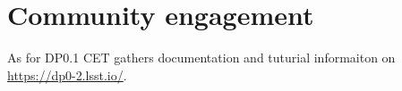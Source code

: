 \section{Community engagement} \label{sec:cet}

As for DP0.1 CET gathers documentation and tuturial informaiton on \url{https://dp0-2.lsst.io/}.

